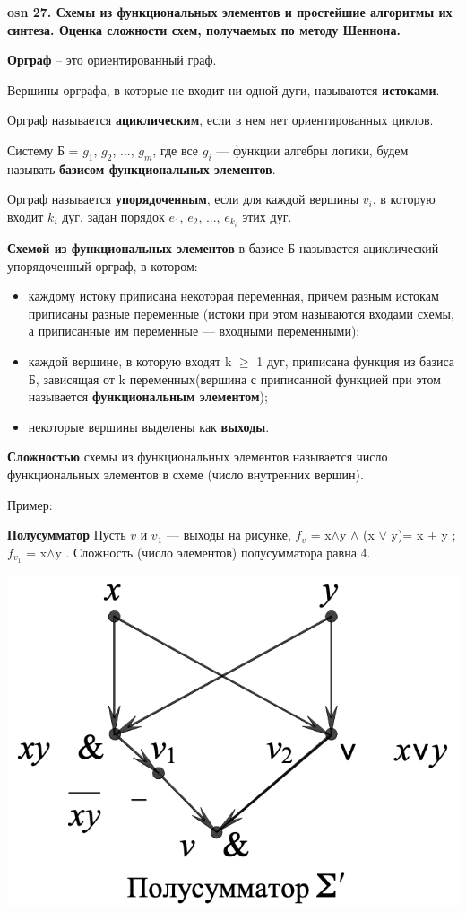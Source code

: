 \textbf{\LARGE osn 27. Схемы из функциональных элементов и простейшие алгоритмы их синтеза. Оценка сложности схем, получаемых по методу Шеннона.}

\textbf{Орграф} -- это ориентированный граф.

Вершины орграфа, в которые не входит ни одной дуги, называются \textbf{истоками}.

Орграф называется \textbf{ациклическим}, если в нем нет ориентированных циклов.

Систему Б = {$g_1$, $g_2$, ..., $g_m$}, где все $g_i$ — функции алгебры логики, будем называть \textbf{базисом функциональных элементов}.

Орграф называется \textbf{упорядоченным}, если для каждой вершины $v_i$, в которую входит $k_i$ дуг, задан порядок $e_1$, $e_2$, ..., $e_{k_i}$ этих дуг.

\bigbreak

\textbf{Схемой из функциональных элементов} в базисе Б называется ациклический упорядоченный орграф, в котором:
\begin{itemize}
    \item каждому истоку приписана некоторая переменная, причем разным истокам приписаны разные переменные (истоки при этом называются входами схемы, а приписанные им переменные — входными переменными);
    \item каждой вершине, в которую входят k $\geq$ 1 дуг, приписана функция из базиса Б, зависящая от k переменных(вершина с приписанной функцией при этом называется \textbf{функциональным элементом}); 
    \item некоторые вершины выделены как \textbf{выходы}. 
\end{itemize}

\textbf{Сложностью} схемы из функциональных элементов называется число функциональных элементов в схеме (число внутренних вершин).

Пример:

\textbf{Полусумматор} Пусть $v$ и $v_1$ — выходы на рисунке, $f_v$ = x$\wedge$y $\wedge$ (x $\vee$ y)= x + y ; $f_{v_1}$ = x$\wedge$y . Сложность (число элементов) полусумматора равна 4.

\includegraphics[width=0.5\columnwidth]{pics/pol_sum.png}


